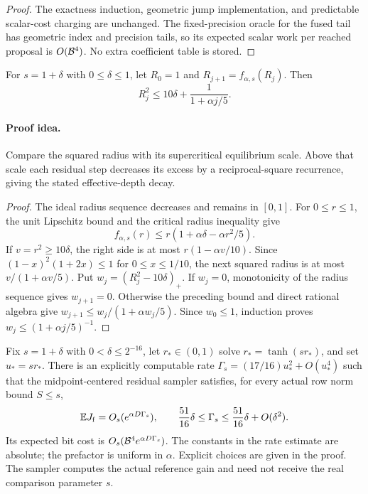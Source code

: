 \begin{proof}
The exactness induction, geometric jump implementation, and
predictable scalar-cost charging are unchanged. The fixed-precision
oracle for the fused tail has geometric index and precision tails,
so its expected scalar work per reached proposal is $O(\mathcal B^4)$.
No extra coefficient table is stored.
\end{proof}

\begin{lemma}
\label{lem:residualsuperradius}
For $s=1+\delta$ with $0\le\delta\le1$, let
$R_0=1$ and $R_{j+1}=f_{\alpha,s}(R_j)$. Then
\begin{equation}\label{eq:residualsuperradius}
R_j^2\le10\delta+\frac1{1+\alpha j/5}.
\end{equation}
\end{lemma}
\paragraph{Proof idea.}
Compare the squared radius with its supercritical equilibrium scale. Above
that scale each residual step decreases its excess by a reciprocal-square
recurrence, giving the stated effective-depth decay.

\begin{proof}
The ideal radius sequence decreases and remains in $[0,1]$.
For $0\le r\le1$, the unit Lipschitz bound and the critical
radius inequality give
\[
f_{\alpha,s}(r)\le r(1+\alpha\delta-\alpha r^2/5).
\]
If $v=r^2\ge10\delta$, the right side is at most
$r(1-\alpha v/10)$. Since
$(1-x)^2(1+2x)\le1$ for $0\le x\le1/10$,
the next squared radius is at most $v/(1+\alpha v/5)$.
Put $w_j=(R_j^2-10\delta)_+$.
If $w_j=0$, monotonicity of the radius sequence gives
$w_{j+1}=0$. Otherwise the preceding bound and direct rational
algebra give
$w_{j+1}\le w_j/(1+\alpha w_j/5)$.
Since $w_0\le1$, induction proves
$w_j\le(1+\alpha j/5)^{-1}$.
\end{proof}

\begin{proposition}
\label{prop:residualfusedrate}
Fix $s=1+\delta$ with $0<\delta\le2^{-16}$, let
$r_*\in(0,1)$ solve $r_*=\tanh(sr_*)$, and set
$u_*=sr_*$. There is an explicitly computable rate
$\Gamma_s=(17/16)u_*^2+O(u_*^4)$ such that the midpoint-centered
residual sampler satisfies, for every actual row norm bound $S\le s$,
\begin{equation}\label{eq:residualfusedrate}
\mathbb E J_{\mathrm f}=O_s(e^{\alpha D\Gamma_s}),\qquad
\frac{51}{16}\delta\le\Gamma_s
\le\frac{51}{16}\delta+O(\delta^2).
\end{equation}
Its expected bit cost is $O_s(\mathcal B^4e^{\alpha D\Gamma_s})$.
The constants in the rate estimate are absolute; the prefactor is
uniform in $\alpha$. Explicit choices are given in the proof.
The sampler computes the actual reference gain and need not
receive the real comparison parameter $s$.
\end{proposition}
